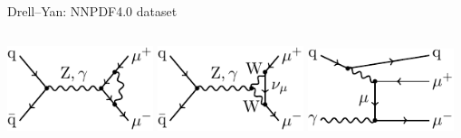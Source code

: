 \begin{frame}{Drell--Yan: NNPDF4.0 dataset}
\begin{columns}[T,onlytextwidth]
\begin{column}{.5\textwidth}

\centering
\includegraphics[width=0.32\textwidth]{ew_corrections/figures/fd04_loop_vertex_correction}
\includegraphics[width=0.32\textwidth]{ew_corrections/figures/fd07_loop_vertex_w_bosons}
\includegraphics[width=0.32\textwidth]{ew_corrections/figures/fd06_photon_quark_real}

\vspace*{0.4cm}



\end{column}
\end{columns}
\end{frame}
